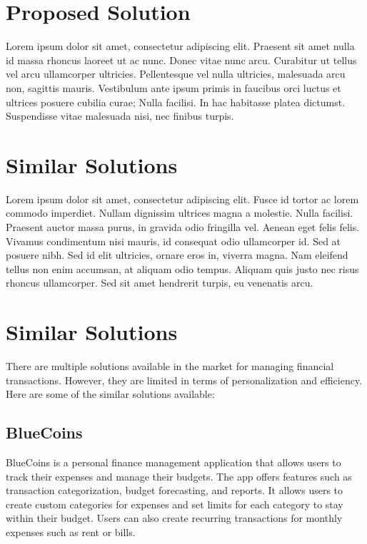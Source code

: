 \section{Proposed Solution}\label{sect:motivation}
\hspace{\parindent} Lorem ipsum dolor sit amet, consectetur adipiscing elit. Praesent sit amet nulla id massa rhoncus laoreet ut ac nunc. Donec vitae nunc arcu. Curabitur ut tellus vel arcu ullamcorper ultricies. Pellentesque vel nulla ultricies, malesuada arcu non, sagittis mauris. Vestibulum ante ipsum primis in faucibus orci luctus et ultrices posuere cubilia curae; Nulla facilisi. In hac habitasse platea dictumst. Suspendisse vitae malesuada nisi, nec finibus turpis.

\section{Similar Solutions}\label{sect:similar solutions}
\hspace{\parindent} Lorem ipsum dolor sit amet, consectetur adipiscing elit. Fusce id tortor ac lorem commodo imperdiet. Nullam dignissim ultrices magna a molestie. Nulla facilisi. Praesent auctor massa purus, in gravida odio fringilla vel. Aenean eget felis felis. Vivamus condimentum nisi mauris, id consequat odio ullamcorper id. Sed at posuere nibh. Sed id elit ultricies, ornare eros in, viverra magna. Nam eleifend tellus non enim accumsan, at aliquam odio tempus. Aliquam quis justo nec risus rhoncus ullamcorper. Sed sit amet hendrerit turpis, eu venenatis arcu.

\section{Similar Solutions}\label{sect:similar solutions}
\hspace{\parindent} There are multiple solutions available in the market for managing financial transactions. However, they are limited in terms of personalization and efficiency. Here are some of the similar solutions available:

\subsection{BlueCoins}
BlueCoins is a personal finance management application that allows users to track their expenses and manage their budgets. The app offers features such as transaction categorization, budget forecasting, and reports. It allows users to create custom categories for expenses and set limits for each category to stay within their budget. Users can also create recurring transactions for monthly expenses such as rent or bills.


